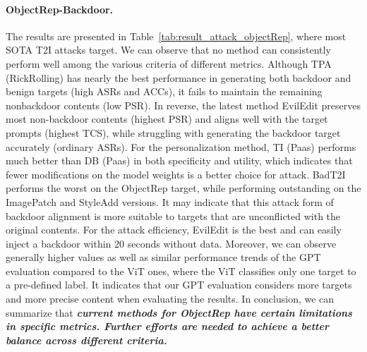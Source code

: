 \paragraph{ObjectRep-Backdoor.}
The results are presented in Table~\ref{tab:result_attack_objectRep}, where most SOTA T2I attacks target. 
We can observe that no method can consistently perform well among the various criteria of different metrics. Although TPA (RickRolling) has nearly the best performance in generating both backdoor and benign targets (high ASRs and ACCs), it fails to maintain the remaining nonbackdoor contents (low PSR). In reverse, the latest method EvilEdit preserves most non-backdoor contents (highest PSR) and aligns well with the target prompts (highest TCS), while struggling with generating the backdoor target accurately (ordinary ASRs). 
For the personalization method, TI (Paas) performs much better than DB (Paas) in both specificity and utility, which indicates that fewer modifications on the model weights is a better choice for attack. BadT2I performs the worst on the ObjectRep target, while performing outstanding on the ImagePatch and StyleAdd versions. It may indicate that this attack form of backdoor alignment is more suitable to targets that are unconflicted with the original contents. For the attack efficiency, EvilEdit is the best and can easily inject a backdoor within 20 seconds without data.
Moreover, we can observe generally higher values as well as similar performance trends of the GPT evaluation compared to the ViT ones, where the ViT classifies only one target to a pre-defined label. It indicates that our GPT evaluation considers more targets and more precise content when evaluating the results.
In conclusion, we can summarize that \textit{\textbf{current methods for ObjectRep have certain limitations in specific metrics. Further efforts are needed to achieve a better balance across different criteria.}}



